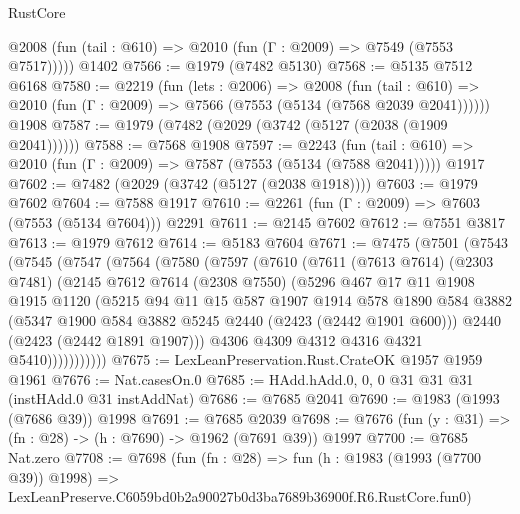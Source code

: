 \begin{lexlean}{RustCore}
\begin{coremodule}
      @2008 (fun (tail : @610) => @2010 (fun (Γ : @2009) => @7549 (@7553 @7517)))))
    @1402
@7566 := @1979 (@7482 @5130)
@7568 := @5135 @7512 @6168
@7580 := @2219
    (fun (lets : @2006) =>
    @2008
      (fun (tail : @610) => @2010 (fun (Γ : @2009) => @7566 (@7553 (@5134 (@7568 @2039 @2041))))))
    @1908
@7587 := @1979 (@7482 (@2029 (@3742 (@5127 (@2038 (@1909 @2041))))))
@7588 := @7568 @1908
@7597 := @2243
    (fun (tail : @610) => @2010 (fun (Γ : @2009) => @7587 (@7553 (@5134 (@7588 @2041)))))
    @1917
@7602 := @7482 (@2029 (@3742 (@5127 (@2038 @1918))))
@7603 := @1979 @7602
@7604 := @7588 @1917
@7610 := @2261 (fun (Γ : @2009) => @7603 (@7553 (@5134 @7604))) @2291
@7611 := @2145 @7602
@7612 := @7551 @3817
@7613 := @1979 @7612
@7614 := @5183 @7604
@7671 := @7475
    (@7501
      (@7543
        (@7545
          (@7547
            (@7564
              (@7580
                (@7597
                  (@7610
                    (@7611
                      (@7613 @7614)
                      (@2303 @7481)
                      (@2145
                        @7612
                        @7614
                        (@2308 @7550)
                        (@5296
                          @467
                          @17
                          @11
                          @1908
                          @1915
                          @1120
                          (@5215
                            @94
                            @11
                            @15
                            @587
                            @1907
                            @1914
                            @578
                            @1890
                            @584
                            @3882
                            (@5347 @1900 @584 @3882 @5245 @2440 (@2423 (@2442 @1901 @600)))
                            @2440
                            (@2423 (@2442 @1891 @1907)))
                          @4306
                          @4309
                          @4312
                          @4316
                          @4321
                          @5410)))))))))))
@7675 := LexLeanPreservation.Rust.CrateOK @1957 @1959 @1961
@7676 := Nat.casesOn.{0}
@7685 := HAdd.hAdd.{0, 0, 0} @31 @31 @31 (instHAdd.{0} @31 instAddNat)
@7686 := @7685 @2041
@7690 := @1983 (@1993 (@7686 @39)) @1998
@7691 := @7685 @2039
@7698 := @7676 (fun (y : @31) => (fn : @28) -> (h : @7690) -> @1962 (@7691 @39)) @1997
@7700 := @7685 Nat.zero
@7708 := @7698
    (fun (fn : @28) =>
    fun (h : @1983 (@1993 (@7700 @39)) @1998) =>
    LexLeanPreserve.C6059bd0b2a90027b0d3ba7689b36900f.R6.RustCore.fun0)

\end{coremodule}
\end{lexlean}
